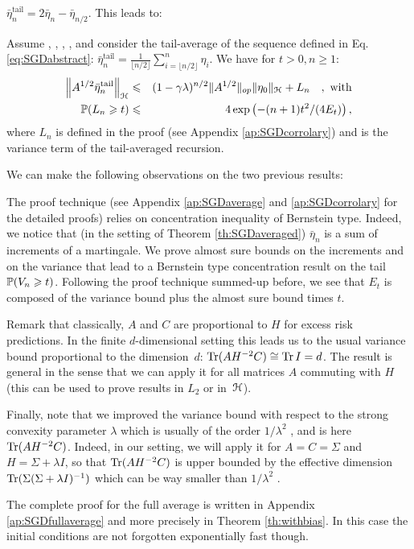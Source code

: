 $\bar{\eta}_n^{\textrm {tail}}  = 2 \bar{\eta}_n  - \bar{\eta}_{n/2}$. This leads to:
 \clearpage
 \begin{corollary}
 \label{co:SGDtailaveraged}
Assume , , , ,  and consider the tail-average of the sequence defined in Eq. \eqref{eq:SGDabstract}: $\bar{\eta}_n^{\textrm {tail}} = \frac{1}{\lfloor n/2 \rfloor} \sum_{i=\lfloor n/2 \rfloor}^{n} \eta_i$.
 We have for $t > 0, n \geqslant 1$:   
\begin{eqnarray}
\left\|A^{1/2}\bar{\eta}_n^{\textrm {tail}} \right\|_\H &\leqslant& (1-\gamma\lambda)^{n/2} \|A^{1/2}\|_{op} \|\eta_0\|_\H + L_n \quad,\ \text{with} \\
 \P(L_n \geqslant t ) &\leqslant& 4\exp\left( -  (n+1)t^2 /( 4 E_t)\right),
\end{eqnarray}
where $L_n$ is defined in the proof (see Appendix \ref{ap:SGDcorrolary}) and is the variance term of the tail-averaged recursion.
\end{corollary}
%
We can make the following observations on the two previous results:
\vspace{-0.1cm}
\BIT
\itemsep-3pt
\item The proof technique (see Appendix \ref{ap:SGDaverage} and \ref{ap:SGDcorrolary} for the detailed proofs) relies on concentration inequality of Bernstein type. Indeed, we notice that (in the setting of  Theorem \ref{th:SGDaveraged}) $\bar{\eta}_n$ is a sum of increments of a martingale. We prove almost sure bounds on the increments and on the variance \citep[following the proof technique of][]{daft} that lead to a Bernstein type concentration result on the tail $\P (V_n \geqslant t)$. Following the proof technique summed-up before, we see that $E_t$ is composed of the variance bound plus the almost sure bound times $t$. 
%
\item Remark that classically, $A$ and $C$ are proportional to $H$ for excess risk predictions. In the finite $d$-dimensional setting this leads us to the usual variance bound proportional to the dimension~$d$: $\tr (AH^{-2}C) \cong \tr \idm = d$. The result is general in the sense that we can apply it for all  matrices $A$ commuting with $H$ (this can be used to prove results in $L_2$ or in~$\H$). 
%
\item Finally, note that we improved the variance bound with respect to the strong convexity parameter $\lambda$ which is usually of the order $1/\lambda^2$ \citep[see][]{shamir2011SGD}, and is here $\tr (AH^{-2}C)$. Indeed, in our setting, we will apply it for $A = C = \Sigma$ and $H = \Sigma + \lambda I$, so that $\tr (AH^{-2}C)$ is upper bounded by the effective dimension $\tr (\Sigma (\Sigma + \lambda I)^{-1})$ which can be way smaller than $1/\lambda^2$ \citep[see][]{caponnetto2007optimal,dieuleveut2016nonparametric}.
%
\item The complete proof for the full average is written in Appendix \ref{ap:SGDfullaverage} and more precisely in Theorem \ref{th:withbias}. In this case the initial conditions are not forgotten exponentially fast though.
\EIT



